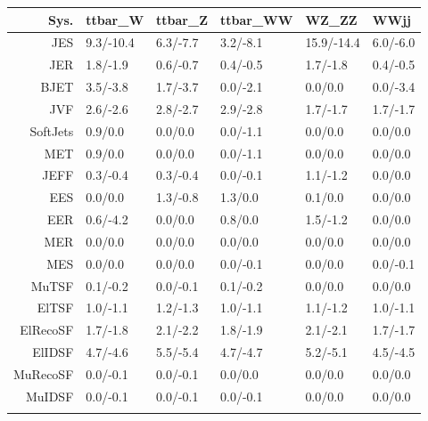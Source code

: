 \begin{tabular}{r|p{.08\linewidth}p{.08\linewidth}p{.08\linewidth}p{.08\linewidth}p{.08\linewidth}}
\toprule
 Sys.  & ttbar\_W & ttbar\_Z & ttbar\_WW & WZ\_ZZ & WWjj \\
\toprule
JES  & 9.3/-10.4 & 6.3/-7.7 & 3.2/-8.1 & 15.9/-14.4 & 6.0/-6.0 \\
JER  & 1.8/-1.9 & 0.6/-0.7 & 0.4/-0.5 & 1.7/-1.8 & 0.4/-0.5 \\
BJET  & 3.5/-3.8 & 1.7/-3.7 & 0.0/-2.1 & 0.0/0.0 & 0.0/-3.4 \\
JVF  & 2.6/-2.6 & 2.8/-2.7 & 2.9/-2.8 & 1.7/-1.7 & 1.7/-1.7 \\
SoftJets  & 0.9/0.0 & 0.0/0.0 & 0.0/-1.1 & 0.0/0.0 & 0.0/0.0 \\
MET  & 0.9/0.0 & 0.0/0.0 & 0.0/-1.1 & 0.0/0.0 & 0.0/0.0 \\
JEFF  & 0.3/-0.4 & 0.3/-0.4 & 0.0/-0.1 & 1.1/-1.2 & 0.0/0.0 \\
EES  & 0.0/0.0 & 1.3/-0.8 & 1.3/0.0 & 0.1/0.0 & 0.0/0.0 \\
EER  & 0.6/-4.2 & 0.0/0.0 & 0.8/0.0 & 1.5/-1.2 & 0.0/0.0 \\
MER  & 0.0/0.0 & 0.0/0.0 & 0.0/0.0 & 0.0/0.0 & 0.0/0.0 \\
MES  & 0.0/0.0 & 0.0/0.0 & 0.0/-0.1 & 0.0/0.0 & 0.0/-0.1 \\
MuTSF  & 0.1/-0.2 & 0.0/-0.1 & 0.1/-0.2 & 0.0/0.0 & 0.0/0.0 \\
ElTSF  & 1.0/-1.1 & 1.2/-1.3 & 1.0/-1.1 & 1.1/-1.2 & 1.0/-1.1 \\
ElRecoSF  & 1.7/-1.8 & 2.1/-2.2 & 1.8/-1.9 & 2.1/-2.1 & 1.7/-1.7 \\
ElIDSF  & 4.7/-4.6 & 5.5/-5.4 & 4.7/-4.7 & 5.2/-5.1 & 4.5/-4.5 \\
MuRecoSF  & 0.0/-0.1 & 0.0/-0.1 & 0.0/0.0 & 0.0/0.0 & 0.0/0.0 \\
MuIDSF  & 0.0/-0.1 & 0.0/-0.1 & 0.0/-0.1 & 0.0/0.0 & 0.0/0.0 \\
 \\
\bottomrule
\end{tabular}

